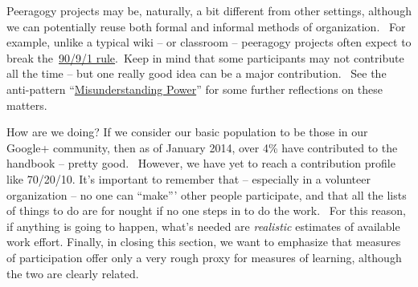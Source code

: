 Peeragogy projects may be, naturally, a bit different from other
settings, although we can potentially reuse both formal and informal
methods of organization.~ For example, unlike a typical wiki -- or
classroom -- peeragogy projects often expect to break
the~\href{http://en.wikipedia.org/wiki/1\%25_rule_\%28Internet_culture\%29}{90/9/1
rule}.~Keep in mind that some participants may not contribute all the
time -- but one really good idea can be a major contribution.~ See the
anti-pattern
``\href{http://peeragogy.org/practice/antipatterns/misunderstanding-power/}{Misunderstanding
Power}'' for some further reflections on these matters.

How are we doing? If we consider our basic population to be those in our
Google+ community, then as of January 2014, over 4\% have contributed to
the handbook -- pretty good.~ However, we have yet to reach a
contribution profile like 70/20/10. It's important to remember that --
especially in a volunteer organization -- no one can ``make''' other
people participate, and that all the lists of things to do are for
nought if no one steps in to do the work.~ For this reason, if anything
is going to happen, what's needed are \emph{realistic} estimates of
available work effort. Finally, in closing this section, we want to
emphasize that measures of participation offer only a very rough proxy
for measures of learning, although the two are clearly related.

